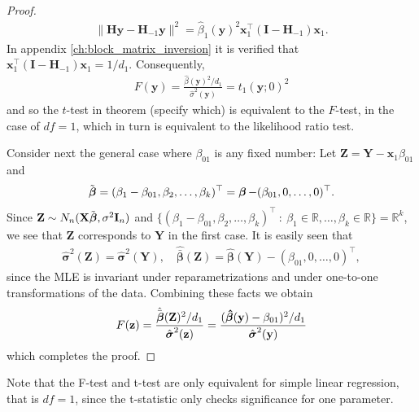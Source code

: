 \begin{proof}
    \begin{align*}
        \|\textbf{H}\textbf{y} - \textbf{H}_{-1}\textbf{y}\|^2 = \hat{\beta}_1(\textbf{y})^2\textbf{x}_1^\top(\textbf{I} - \textbf{H}_{-1})\textbf{x}_1.
    \end{align*}
    In appendix \ref{ch:block_matrix_inversion} it is verified that $\textbf{x}_1^\top(\textbf{I} - \textbf{H}_{-1})\textbf{x}_1 = 1/d_1$.
    Consequently,
    \begin{align*}
        F(\textbf{y}) = \frac{\hat{\beta}(\textbf{y})^2/d_1}{\hat{\sigma}^2(\textbf{y})} = t_1(\textbf{y};0)^2
    \end{align*}
    and so the $t$-test in theorem (specify which) is equivalent to the $F$-test, in the case of $df=1$, which in turn is equivalent to the likelihood ratio test.
    
    Consider next the general case where $\beta_{01}$ is any fixed number: Let $\textbf{Z} = \textbf{Y} - \textbf{x}_1\beta_{01}$ and
    \begin{align*}
        \Tilde{\operatorname{\boldsymbol{\beta}}} = (\beta_1 - \beta_{01}, \beta_2, \ldots, \beta_k)^\top = \operatorname{\boldsymbol{\beta}} - (\beta_{01}, 0, \ldots, 0)^\top.
    \end{align*}
    Since $\textbf{Z} \sim N_n(\textbf{X}\Tilde{\boldsymbol{\beta}}, \sigma^2\textbf{I}_n)$ and $\{ (\beta_1 - \beta_{01}, \beta_2, \ldots, \beta_k)^\top \ : \ \beta_1 \in \mathbb{R}, \ldots, \beta_k \in \mathbb{R} \} = \mathbb{R}^k$, we see that $\textbf{Z}$ corresponds to $\textbf{Y}$ in the first case.
    It is easily seen that
    \begin{align*}
        \hat{\boldsymbol{\sigma}}^2(\textbf{Z}) = \hat{\boldsymbol{\sigma}}^2(\textbf{Y}), \quad \hat{\bar{\boldsymbol{\beta}}}(\textbf{Z}) = \hat{\boldsymbol{\beta}}(\textbf{Y}) - (\beta_{01}, 0, \ldots, 0)^\top,
    \end{align*}
    since the MLE is invariant under reparametrizations and under one-to-one transformations of the data.
    Combining these facts we obtain
    \begin{align*}
        F(\textbf{z}) =
        \frac{\hat{\bar{\boldsymbol{\beta}}}(\textbf{Z})^2/d_1}{\hat{\boldsymbol{\sigma}}^2(\textbf{z})} = 
        \frac{(\operatorname{\boldsymbol{\hat{\beta}}}(\textbf{y}) - \beta_{01})^2/d_1}{\hat{\boldsymbol{\sigma}}^2(\textbf{y})}
    \end{align*}
    which completes the proof.
\end{proof}

Note that the F-test and t-test are only equivalent for simple linear regression, that is $df = 1$, since the t-statistic only checks significance for one parameter.

